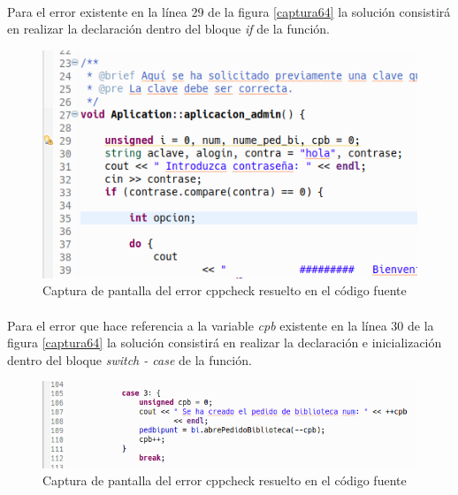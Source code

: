 			\paragraph{}Para el error existente en la línea 29 de la figura \ref*{captura64} la solución consistirá en realizar la declaración  dentro del bloque \textit{if} de la función.
			
			\begin{figure}[H]
				\centering
				\includegraphics[scale=0.7]{img/captura70.png}
				\caption{Captura de pantalla del error cppcheck  resuelto en el código fuente}
				\label{captura70}
			\end{figure}
	
			\paragraph{}Para el error que hace referencia a la variable \textit{cpb} existente en la línea 30 de la figura \ref*{captura64} la solución consistirá en realizar la declaración e inicialización dentro del bloque \textit{switch - case} de la función.
			
			\begin{figure}[H]
				\centering
				\includegraphics[scale=0.6]{img/captura71.png}
				\caption{Captura de pantalla del error cppcheck  resuelto en el código fuente}
				\label{captura71}
			\end{figure}
		
